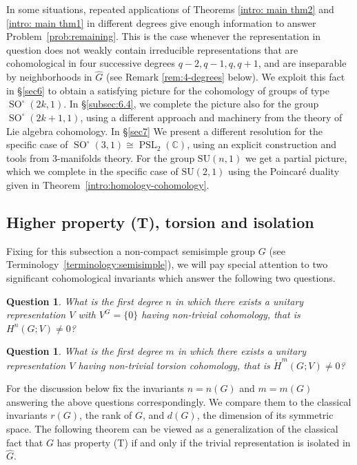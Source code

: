 \documentclass[12pt,reqno]{amsart}
\newcommand{\C}{\mathbb{C}}
\newtheorem{question}[theorem]{Question}
\theoremstyle{definition}
\newcommand{\PSL}{\operatorname{PSL}}
\newcommand{\SO}{\operatorname{SO}}
\newcommand{\torH}{\mathring{H}}
\begin{document}
In some situations, repeated applications of Theorems \ref{intro: main thm2} and \ref{intro: main thm1} in different degrees give enough information to answer Problem~\ref{prob:remaining}.
This is the case whenever the representation in question does not weakly contain irreducible representations that are cohomological in four successive degrees $q-2,q-1,q,q+1$, and are inseparable by neighborhoods in $\widehat{G}$ (see Remark \ref{rem:4-degrees} below).
We exploit this fact in \S\ref{sec6} to obtain a satisfying picture for the cohomology of groups of type $\SO^\circ(2k,1)$. In \S\ref{subsec:6.4}, we complete the picture also for the group $\SO^\circ(2k+1,1)$, using a different approach and machinery from the theory of Lie algebra cohomology. In \S\ref{sec7} We present a different resolution for the specific case of $\SO^\circ(3,1) \cong \PSL_2(\C)$, using an explicit construction and tools from $3$-manifolds theory. For the group $\mathrm{SU}(n,1)$ we get a partial picture, which we complete in the specific case of $\mathrm{SU}(2,1)$ using the Poincar\'e duality given in Theorem~\ref{intro:homology-cohomology}.


\subsection{Higher property (T), torsion and isolation} \label{subsec:isolation}

Fixing for this subsection a non-compact semisimple group $G$ (see Terminology~\ref{terminology:semisimple}),
we will pay special attention to two significant cohomological invariants which answer the following two questions.

\begin{question} \label{que:higherT}
    What is the first degree $n$ in which there exists a unitary representation $V$ with $V^G=\{0\}$ having non-trivial cohomology, that is $H^n(G;V)\neq 0$? 
\end{question}

\begin{question} \label{que:highertor}
    What is the first degree $m$ in which there exists a unitary representation $V$ having non-trivial torsion cohomology, that is $\torH^m(G;V)\neq 0$? 
\end{question}

For the discussion below fix the invariants $n=n(G)$ and $m=m(G)$ answering the above questions correspondingly.
We compare them to the classical invariants $r(G)$, the rank of $G$, and $d(G)$, the dimension of its symmetric space.
The following theorem can be viewed as a generalization of the classical fact that $G$ has property (T) if and only if the trivial representation is isolated in $\widehat{G}$.
\end{document}
